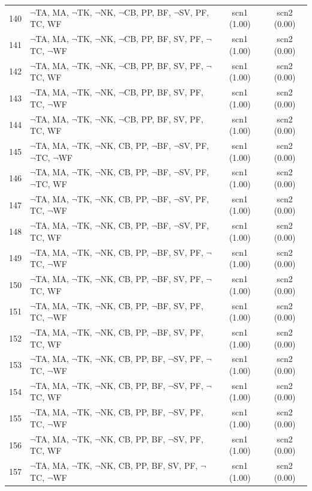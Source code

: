 \documentclass[12pt]{article}
\begin{document}
\begin{longtable}{|l|l|c|c|}
140 & $\neg$TA, MA, $\neg$TK, $\neg$NK, $\neg$CB, PP, BF, $\neg$SV, PF, TC, WF & scn1 (1.00) & scn2 (0.00)\\
141 & $\neg$TA, MA, $\neg$TK, $\neg$NK, $\neg$CB, PP, BF, SV, PF, $\neg$TC, $\neg$WF & scn1 (1.00) & scn2 (0.00)\\
142 & $\neg$TA, MA, $\neg$TK, $\neg$NK, $\neg$CB, PP, BF, SV, PF, $\neg$TC, WF & scn1 (1.00) & scn2 (0.00)\\
143 & $\neg$TA, MA, $\neg$TK, $\neg$NK, $\neg$CB, PP, BF, SV, PF, TC, $\neg$WF & scn1 (1.00) & scn2 (0.00)\\
144 & $\neg$TA, MA, $\neg$TK, $\neg$NK, $\neg$CB, PP, BF, SV, PF, TC, WF & scn1 (1.00) & scn2 (0.00)\\
145 & $\neg$TA, MA, $\neg$TK, $\neg$NK, CB, PP, $\neg$BF, $\neg$SV, PF, $\neg$TC, $\neg$WF & scn1 (1.00) & scn2 (0.00)\\
146 & $\neg$TA, MA, $\neg$TK, $\neg$NK, CB, PP, $\neg$BF, $\neg$SV, PF, $\neg$TC, WF & scn1 (1.00) & scn2 (0.00)\\
147 & $\neg$TA, MA, $\neg$TK, $\neg$NK, CB, PP, $\neg$BF, $\neg$SV, PF, TC, $\neg$WF & scn1 (1.00) & scn2 (0.00)\\
148 & $\neg$TA, MA, $\neg$TK, $\neg$NK, CB, PP, $\neg$BF, $\neg$SV, PF, TC, WF & scn1 (1.00) & scn2 (0.00)\\
149 & $\neg$TA, MA, $\neg$TK, $\neg$NK, CB, PP, $\neg$BF, SV, PF, $\neg$TC, $\neg$WF & scn1 (1.00) & scn2 (0.00)\\
150 & $\neg$TA, MA, $\neg$TK, $\neg$NK, CB, PP, $\neg$BF, SV, PF, $\neg$TC, WF & scn1 (1.00) & scn2 (0.00)\\
151 & $\neg$TA, MA, $\neg$TK, $\neg$NK, CB, PP, $\neg$BF, SV, PF, TC, $\neg$WF & scn1 (1.00) & scn2 (0.00)\\
152 & $\neg$TA, MA, $\neg$TK, $\neg$NK, CB, PP, $\neg$BF, SV, PF, TC, WF & scn1 (1.00) & scn2 (0.00)\\
153 & $\neg$TA, MA, $\neg$TK, $\neg$NK, CB, PP, BF, $\neg$SV, PF, $\neg$TC, $\neg$WF & scn1 (1.00) & scn2 (0.00)\\
154 & $\neg$TA, MA, $\neg$TK, $\neg$NK, CB, PP, BF, $\neg$SV, PF, $\neg$TC, WF & scn1 (1.00) & scn2 (0.00)\\
155 & $\neg$TA, MA, $\neg$TK, $\neg$NK, CB, PP, BF, $\neg$SV, PF, TC, $\neg$WF & scn1 (1.00) & scn2 (0.00)\\
156 & $\neg$TA, MA, $\neg$TK, $\neg$NK, CB, PP, BF, $\neg$SV, PF, TC, WF & scn1 (1.00) & scn2 (0.00)\\
157 & $\neg$TA, MA, $\neg$TK, $\neg$NK, CB, PP, BF, SV, PF, $\neg$TC, $\neg$WF & scn1 (1.00) & scn2 (0.00)\\

\end{longtable}
\end{document}
